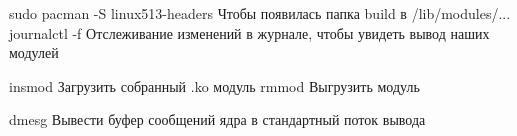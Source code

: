 sudo pacman -S linux513-headers
	Чтобы появилась папка build в /lib/modules/...
journalctl -f
	Отслеживание изменений в журнале, чтобы увидеть вывод наших модулей

insmod
	Загрузить собранный .ko модуль
rmmod
	Выгрузить модуль

dmesg
	Вывести буфер сообщений ядра в стандартный поток вывода
